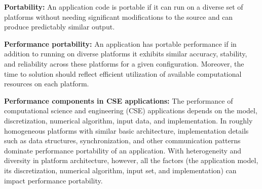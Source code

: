 \documentclass[]{article}
\date{}
\begin{document}
\pagestyle{fancy}
\renewcommand{\headrulewidth}{0pt}
  
\thispagestyle{empty}

\textbf{\newline \newline \newline Portability:} An application code is portable if it can run on a
diverse set of platforms without needing significant modifications to
the source and can produce predictably similar output.

\textbf {Performance portability:} An application has portable
performance if in addition to running on diverse platforms it exhibits
similar accuracy, stability, and reliability across these platforms for
a given configuration. Moreover, the time to solution should reflect
efficient utilization of available computational resources on each
platform.

\textbf{Performance components in CSE applications:} The performance
of computational science and engineering (CSE) applications depends on
the model, discretization, numerical algorithm, input data, and
implementation. In roughly homogeneous platforms with similar basic
architecture, implementation details such as data structures,
synchronization, and other communication patterns dominate performance
portability of an application. With heterogeneity and diversity in
platform architecture, however, all the factors (the application model,
its discretization, numerical algorithm, input set, and implementation)
can impact performance portability.
\end{document}
